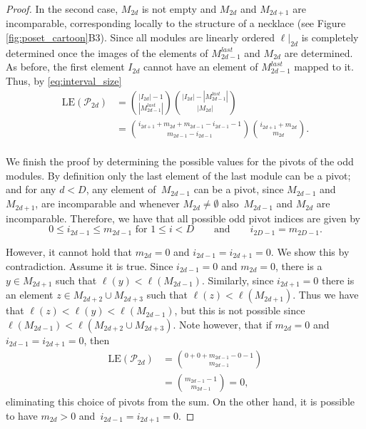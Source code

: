\documentclass[9pt,a4paper,oneside]{article}
\newcommand{\cP}{\mathcal{P}}
\newcommand{\lex}{\mathrm{LE}}
\begin{document}
\begin{proof}
In the second case,  $M_{2d}$ is not empty and $M_{2d}$ and $M_{2d+1}$ are incomparable, corresponding locally to the structure of a necklace  (see Figure \ref{fig:poset_cartoon}B3).
Since all modules are linearly ordered $\ell|_{2d}$ is completely determined once the images of the elements of $M_{2d-1}^{last}$ and $M_{2d}$ are determined. 
As before,  the first element $I_{2d}$ cannot have an element of $M_{2d-1}^{last}$ mapped to it.
Thus,  by \eqref{eq:interval_size} 
\begin{align*}
\lex({\cP_{2d}})
&=\binom{|I_{2d}|-1}{|M_{2d-1}^{last}|}\binom{|I_{2d}|-|M_{2d-1}^{last}|}{|M_{2d}|}\\
&=\binom{i_{2d+1}+m_{2d}+m_{2d-1}-i_{2d-1}-1}{m_{2d-1}-i_{2d-1}}\binom{i_{2d+1}+m_{2d}}{m_{2d}}.
\end{align*}\\

We finish the proof by determining the possible values for the pivots of the odd modules. 
By definition only the last element of the last module can be a pivot;
and for any $d < D$,  any element of~$M_{2d-1}$ can be a pivot,  since $M_{2d-1}$ and $M_{2d+1}$,  are incomparable and whenever  $M_{2d}\neq \emptyset$ also~$M_{2d-1}$ and $M_{2d}$ are incomparable. 
Therefore,  we have that all possible odd pivot indices are given by
\[ 0 \leq i_{2d-1} \leq m_{2d-1} \text{ for } 1\leq i<D  \quad\quad \text{and} \quad\quad i_{2D-1}=m_{2D-1}.\]

However,  it cannot hold that $m_{2d}=0$ and $i_{2d-1}=i_{2d+1}=0$.  We show this by contradiction. 
Assume it is true.  Since $i_{2d-1}=0$ and $m_{2d}=0$,  there is a $y\in M_{2d+1}$ such that $\ell(y)<\ell(M_{2d-1})$.  Similarly, since $i_{2d+1}=0$ there is an element $z\in M_{2d+2}\cup M_{2d+3}$ such that $\ell(z)<\ell(M_{2d+1})$. 
Thus we have that $\ell(z)<\ell(y)<\ell(M_{2d-1})$,  but this is not possible since $\ell(M_{2d-1})<\ell(M_{2d+2}\cup M_{2d+3})$.
Note however,  that if $m_{2d}=0$ and $i_{2d-1}=i_{2d+1}=0$, then 
\begin{align*}
\lex({\cP_{2d}})
&=\binom{0+0+m_{2d-1}-0-1}{m_{2d-1}}\\
&=\binom{m_{2d-1}-1}{m_{2d-1}}=0, 
\end{align*}
eliminating this choice of pivots from the sum.
On the other hand,  it is possible to have $m_{2d}>0$ and~$i_{2d-1}=i_{2d+1}=0$.
\end{proof}
\end{document}
